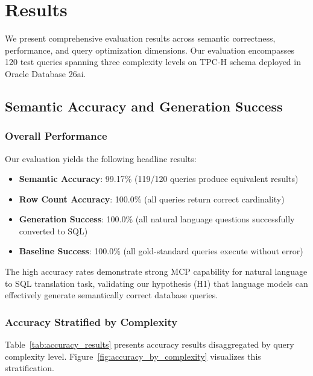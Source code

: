 \section{Results}
\label{sec:results}

We present comprehensive evaluation results across semantic correctness, performance, and query optimization dimensions. Our evaluation encompasses 120 test queries spanning three complexity levels on TPC-H schema deployed in Oracle Database 26ai.

\subsection{Semantic Accuracy and Generation Success}

\subsubsection{Overall Performance}

Our evaluation yields the following headline results:

\begin{itemize}
    \item \textbf{Semantic Accuracy}: 99.17\% (119/120 queries produce equivalent results)
    \item \textbf{Row Count Accuracy}: 100.0\% (all queries return correct cardinality)
    \item \textbf{Generation Success}: 100.0\% (all natural language questions successfully converted to SQL)
    \item \textbf{Baseline Success}: 100.0\% (all gold-standard queries execute without error)
\end{itemize}

The high accuracy rates demonstrate strong MCP capability for natural language to SQL translation task, validating our hypothesis (H1) that language models can effectively generate semantically correct database queries.



\subsubsection{Accuracy Stratified by Complexity}

Table~\ref{tab:accuracy_results} presents accuracy results disaggregated by query complexity level. Figure~\ref{fig:accuracy_by_complexity} visualizes this stratification.

